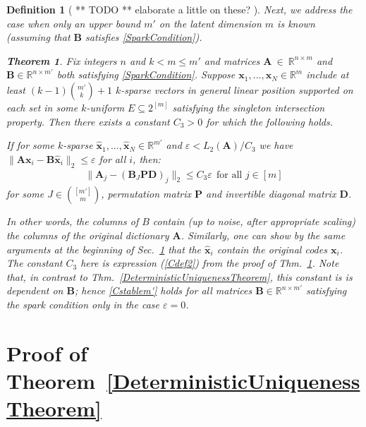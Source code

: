 \documentclass[9pt,twocolumn]{pnas-new}
\newtheorem{theorem}{Theorem}
\newtheorem{definition}{Definition}
\begin{document}
\begin{definition}
[ ** TODO ** elaborate a little on these? ]

Next, we address the case when only an upper bound $m'$ on the latent dimension $m$ is known (assuming that $\mathbf{B}$ satisfies \eqref{SparkCondition}).

\begin{theorem}\label{DeterministicUniquenessTheorem2}
Fix integers $n$ and $k < m \leq m'$ and matrices $\mathbf{A}~\in~\mathbb{R}^{n \times m}$ and $\mathbf{B} \in \mathbb{R}^{n \times m'}$ both satisfying \eqref{SparkCondition}. Suppose \mbox{$\mathbf{x}_1, \ldots, \mathbf{x}_N \in \mathbb{R}^m$} include at least \mbox{$(k-1){m' \choose k}+1$} $k$-sparse vectors in general linear position supported on each set in some $k$-uniform $E \subseteq 2^{[m]}$ satisfying the singleton intersection property. Then there exists a constant $C_3 > 0$ for which the following holds.

If for some $k$-sparse $\mathbf{\hat x}_1, \ldots, \mathbf{\hat x}_N \in \mathbb{R}^{m'}$ and $\varepsilon < L_2(\mathbf{A}) / C_3$ we have \mbox{$\|\mathbf{A}\mathbf{x}_i - \mathbf{B}\mathbf{\hat x}_i\|_2 \leq \varepsilon$} for all $i$, then:
\begin{align}\label{Cstablem'}
\|\mathbf{A}_j-(\mathbf{B}_J\mathbf{PD})_j\|_2 \leq C_3\varepsilon \ \ \text{for all $j \in [m]$}
\end{align}
%
for some $J \in {[m'] \choose m}$, permutation matrix $\mathbf{P}$ and invertible diagonal matrix $\mathbf{D}$.
\end{theorem}

In other words, the columns of $B$ contain (up to noise, after appropriate scaling) the columns of the original dictionary $\mathbf{A}$. Similarly, one can show by the same arguments at the beginning of Sec.~\ref{DUT} that the $\mathbf{\hat x}_i$ contain the original codes $\mathbf{x}_i$. The constant $C_3$ here is expression (\ref{Cdef2}) from the proof of Thm.~\ref{DeterministicUniquenessTheorem2}. Note that, in contrast to Thm.~\ref{DeterministicUniquenessTheorem}, this constant is is dependent on $\mathbf{B}$; hence \eqref{Cstablem'} holds for \emph{all} matrices $\mathbf{B} \in \mathbb{R}^{n \times m'}$ satisfying the spark condition only in the case $\varepsilon = 0$. 

\section{Proof of Theorem~\ref{DeterministicUniquenessTheorem}}\label{DUT}


\end{definition}
\end{document}
